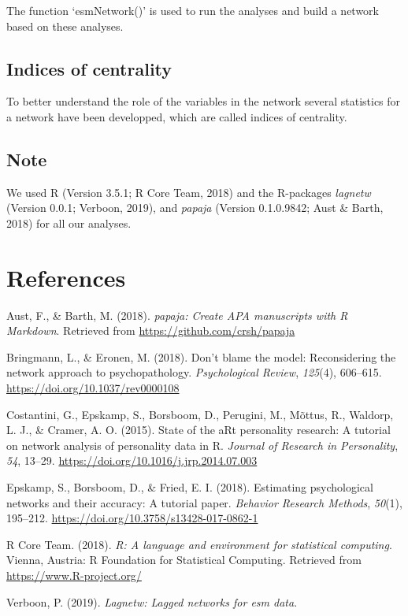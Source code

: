 \documentclass[man,floatsintext]{apa6}
\theoremstyle{definition}
\theoremstyle{definition}
\theoremstyle{definition}
\theoremstyle{remark}
\begin{document}
The function `esmNetwork()' is used to run the analyses and build a
network based on these analyses.

\subsection{Indices of centrality}\label{indices-of-centrality}

To better understand the role of the variables in the network several
statistics for a network have been developped, which are called indices
of centrality.

\subsection{Note}\label{note}

We used R (Version 3.5.1; R Core Team, 2018) and the R-packages
\emph{lagnetw} (Version 0.0.1; Verboon, 2019), and \emph{papaja}
(Version 0.1.0.9842; Aust \& Barth, 2018) for all our analyses.

\newpage

\section{References}\label{references}

\begingroup
\setlength{\parindent}{-0.5in} \setlength{\leftskip}{0.5in}

\hypertarget{refs}{}
\hypertarget{ref-R-papaja}{}
Aust, F., \& Barth, M. (2018). \emph{papaja: Create APA manuscripts with
R Markdown}. Retrieved from \url{https://github.com/crsh/papaja}

\hypertarget{ref-Bringmann2018a}{}
Bringmann, L., \& Eronen, M. (2018). Don't blame the model:
Reconsidering the network approach to psychopathology.
\emph{Psychological Review}, \emph{125}(4), 606--615.
\url{https://doi.org/10.1037/rev0000108}

\hypertarget{ref-Costantini2015}{}
Costantini, G., Epskamp, S., Borsboom, D., Perugini, M., Mõttus, R.,
Waldorp, L. J., \& Cramer, A. O. (2015). State of the aRt personality
research: A tutorial on network analysis of personality data in R.
\emph{Journal of Research in Personality}, \emph{54}, 13--29.
\url{https://doi.org/10.1016/j.jrp.2014.07.003}

\hypertarget{ref-Epskamp2018}{}
Epskamp, S., Borsboom, D., \& Fried, E. I. (2018). Estimating
psychological networks and their accuracy: A tutorial paper.
\emph{Behavior Research Methods}, \emph{50}(1), 195--212.
\url{https://doi.org/10.3758/s13428-017-0862-1}

\hypertarget{ref-R-base}{}
R Core Team. (2018). \emph{R: A language and environment for statistical
computing}. Vienna, Austria: R Foundation for Statistical Computing.
Retrieved from \url{https://www.R-project.org/}

\hypertarget{ref-R-lagnetw}{}
Verboon, P. (2019). \emph{Lagnetw: Lagged networks for esm data}.

\endgroup
\end{document}
